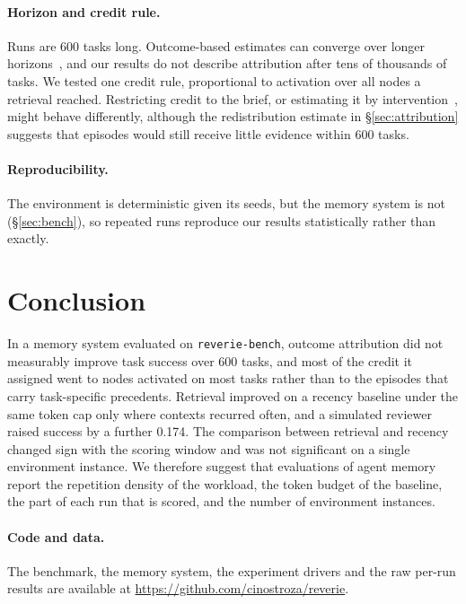 \documentclass{article}
\newcommand{\bench}{\texttt{reverie-bench}}
\begin{document}
\paragraph{Horizon and credit rule.}
Runs are 600 tasks long. Outcome-based estimates can converge over longer
horizons~\cite{whentoforget}, and our results do not describe attribution after tens of
thousands of tasks. We tested one credit rule, proportional to activation over all nodes
a retrieval reached. Restricting credit to the brief, or estimating it by
intervention~\cite{causalreplay}, might behave differently, although the redistribution
estimate in \S\ref{sec:attribution} suggests that episodes would still receive little
evidence within 600 tasks.

\paragraph{Reproducibility.}
The environment is deterministic given its seeds, but the memory system is not
(\S\ref{sec:bench}), so repeated runs reproduce our results statistically rather than
exactly.

\section{Conclusion}

In a memory system evaluated on \bench, outcome attribution did not measurably improve
task success over 600 tasks, and most of the credit it assigned went to nodes activated
on most tasks rather than to the episodes that carry task-specific precedents. Retrieval
improved on a recency baseline under the same token cap only where contexts recurred
often, and a simulated reviewer raised success by a further 0.174. The comparison between
retrieval and recency changed sign with the scoring window and was not significant on a
single environment instance. We therefore suggest that evaluations of agent memory report
the repetition density of the workload, the token budget of the baseline, the part of
each run that is scored, and the number of environment instances.

\paragraph{Code and data.}
The benchmark, the memory system, the experiment drivers and the raw per-run results
are available at \url{https://github.com/cinostroza/reverie}.



\end{document}
